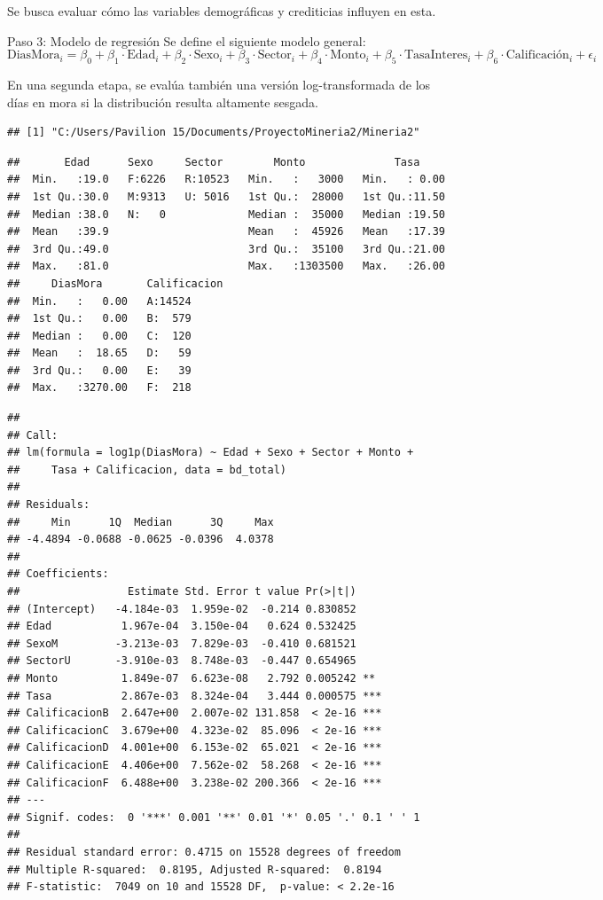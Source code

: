 \documentclass[Royal,times,sageh]{sagej}
\begin{document}
Se busca evaluar cómo las variables demográficas y crediticias influyen
en esta.

Paso 3: Modelo de regresión Se define el siguiente modelo general: \[
\text{DiasMora}_i = \beta_0 + \beta_1 \cdot \text{Edad}_i + \beta_2 \cdot \text{Sexo}_i + \beta_3 \cdot \text{Sector}_i + \beta_4 \cdot \text{Monto}_i + \beta_5 \cdot \text{TasaInteres}_i + \beta_6 \cdot \text{Calificación}_i + \epsilon_i
\]

En una segunda etapa, se evalúa también una versión log-transformada de
los días en mora si la distribución resulta altamente sesgada.

\begin{verbatim}
## [1] "C:/Users/Pavilion 15/Documents/ProyectoMineria2/Mineria2"
\end{verbatim}

\begin{verbatim}
##       Edad      Sexo     Sector        Monto              Tasa      
##  Min.   :19.0   F:6226   R:10523   Min.   :   3000   Min.   : 0.00  
##  1st Qu.:30.0   M:9313   U: 5016   1st Qu.:  28000   1st Qu.:11.50  
##  Median :38.0   N:   0             Median :  35000   Median :19.50  
##  Mean   :39.9                      Mean   :  45926   Mean   :17.39  
##  3rd Qu.:49.0                      3rd Qu.:  35100   3rd Qu.:21.00  
##  Max.   :81.0                      Max.   :1303500   Max.   :26.00  
##     DiasMora       Calificacion
##  Min.   :   0.00   A:14524     
##  1st Qu.:   0.00   B:  579     
##  Median :   0.00   C:  120     
##  Mean   :  18.65   D:   59     
##  3rd Qu.:   0.00   E:   39     
##  Max.   :3270.00   F:  218
\end{verbatim}

\begin{verbatim}
## 
## Call:
## lm(formula = log1p(DiasMora) ~ Edad + Sexo + Sector + Monto + 
##     Tasa + Calificacion, data = bd_total)
## 
## Residuals:
##     Min      1Q  Median      3Q     Max 
## -4.4894 -0.0688 -0.0625 -0.0396  4.0378 
## 
## Coefficients:
##                 Estimate Std. Error t value Pr(>|t|)    
## (Intercept)   -4.184e-03  1.959e-02  -0.214 0.830852    
## Edad           1.967e-04  3.150e-04   0.624 0.532425    
## SexoM         -3.213e-03  7.829e-03  -0.410 0.681521    
## SectorU       -3.910e-03  8.748e-03  -0.447 0.654965    
## Monto          1.849e-07  6.623e-08   2.792 0.005242 ** 
## Tasa           2.867e-03  8.324e-04   3.444 0.000575 ***
## CalificacionB  2.647e+00  2.007e-02 131.858  < 2e-16 ***
## CalificacionC  3.679e+00  4.323e-02  85.096  < 2e-16 ***
## CalificacionD  4.001e+00  6.153e-02  65.021  < 2e-16 ***
## CalificacionE  4.406e+00  7.562e-02  58.268  < 2e-16 ***
## CalificacionF  6.488e+00  3.238e-02 200.366  < 2e-16 ***
## ---
## Signif. codes:  0 '***' 0.001 '**' 0.01 '*' 0.05 '.' 0.1 ' ' 1
## 
## Residual standard error: 0.4715 on 15528 degrees of freedom
## Multiple R-squared:  0.8195, Adjusted R-squared:  0.8194 
## F-statistic:  7049 on 10 and 15528 DF,  p-value: < 2.2e-16
\end{verbatim}
\end{document}
